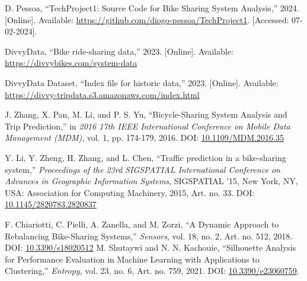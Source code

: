 \begin{thebibliography}{24}

    D. Pessoa, ``TechProject1: Source Code for Bike Sharing System Analysis,'' 2024.
    [Online].
    Available: \url{https://github.com/diogo-pessoa/TechProject1}.
    [Accessed: 07-02-2024].

    DivvyData, ``Bike ride-sharing data,'' 2023.
    [Online].
    Available: \url{https://divvybikes.com/system-data}

    DivvyData Dataset, ``Index file for historic data,'' 2023.
    [Online].
    Available: \url{https://divvy-tripdata.s3.amazonaws.com/index.html}

    J. Zhang, X. Pan, M. Li, and P. S. Yu, ``Bicycle-Sharing System Analysis and Trip Prediction,'' in \textit{2016 17th IEEE International Conference on Mobile Data Management (MDM)}, vol.
    1, pp.
    174-179, 2016.
    DOI: \href{https://doi.org/10.1109/MDM.2016.35}{10.1109/MDM.2016.35}

    Y. Li, Y. Zheng, H. Zhang, and L. Chen, ``Traffic prediction in a bike-sharing system,'' \textit{Proceedings of the 23rd SIGSPATIAL International Conference on Advances in Geographic Information Systems}, SIGSPATIAL '15, New York, NY, USA: Association for Computing Machinery, 2015, Art.
    no.
    33.
    DOI: \href{https://doi.org/10.1145/2820783.2820837}{10.1145/2820783.2820837}

    F. Chiariotti, C. Pielli, A. Zanella, and M. Zorzi, ``A Dynamic Approach to Rebalancing Bike-Sharing Systems,'' \textit{Sensors}, vol.
    18, no.
            2, Art.
            no.
            512, 2018.
            DOI: \href{https://www.mdpi.com/1424-8220/18/2/512}{10.3390/s18020512}
    M. Shutaywi and N. N. Kachouie, ``Silhouette Analysis for Performance Evaluation in Machine Learning with Applications to Clustering,'' \textit{Entropy}, vol. 23, no. 6, Art. no. 759, 2021. DOI: \href{https://www.mdpi.com/1099-4300/23/6/759}{10.3390/e23060759}.

\end{thebibliography}
